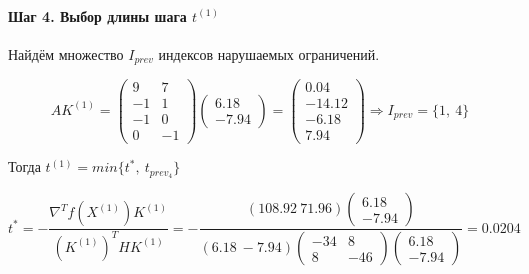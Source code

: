 \paragraph{Шаг 4. Выбор длины шага $t^{(1)}$}

Найдём множество $I_{prev}$ индексов нарушаемых ограничений.

\begin{equation*}
	A K^{(1)} = \begin{pmatrix}
		9 & 7
		\\
		-1 & 1
		\\
		-1 & 0
		\\
		0 & -1
	\end{pmatrix}
	\begin{pmatrix} 6.18 \\ -7.94 \end{pmatrix}
	=
	\begin{pmatrix}
		0.04 \\ -14.12 \\ -6.18 \\ 7.94
	\end{pmatrix}
	\Rightarrow I_{prev} = \{1,\ 4\}
\end{equation*}

Тогда $t^{(1)} = min\{t^*,\ t_{prev_4}\}$

\begin{equation*}
	t^* = -\frac{\nabla^T f(X^{(1)}) K^{(1)}}{(K^{(1)})^T H K^{(1)}} = -\frac{(108.92\  71.96) \begin{pmatrix} 6.18 \\ -7.94 \end{pmatrix}}{(6.18\ -7.94) \begin{pmatrix} -34 & 8 \\ 8 & -46 \end{pmatrix} \begin{pmatrix} 6.18 \\ -7.94 \end{pmatrix}} = 0.0204
\end{equation*}


